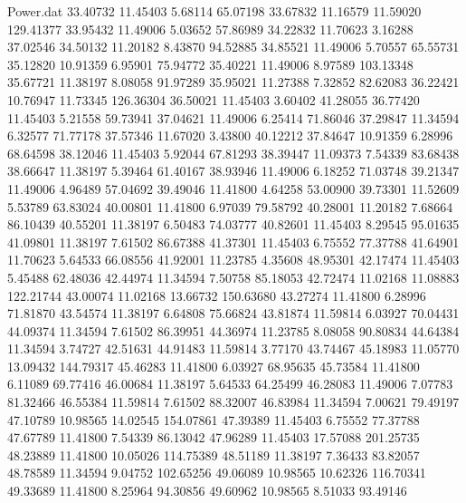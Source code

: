 \begin{filecontents}{Power.dat}
  33.40732   11.45403    5.68114   65.07198
  33.67832   11.16579   11.59020  129.41377
  33.95432   11.49006    5.03652   57.86989
  34.22832   11.70623    3.16288   37.02546
  34.50132   11.20182    8.43870   94.52885
  34.85521   11.49006    5.70557   65.55731
  35.12820   10.91359    6.95901   75.94772
  35.40221   11.49006    8.97589  103.13348
  35.67721   11.38197    8.08058   91.97289
  35.95021   11.27388    7.32852   82.62083
  36.22421   10.76947   11.73345  126.36304
  36.50021   11.45403    3.60402   41.28055
  36.77420   11.45403    5.21558   59.73941
  37.04621   11.49006    6.25414   71.86046
  37.29847   11.34594    6.32577   71.77178
  37.57346   11.67020    3.43800   40.12212
  37.84647   10.91359    6.28996   68.64598
  38.12046   11.45403    5.92044   67.81293
  38.39447   11.09373    7.54339   83.68438
  38.66647   11.38197    5.39464   61.40167
  38.93946   11.49006    6.18252   71.03748
  39.21347   11.49006    4.96489   57.04692
  39.49046   11.41800    4.64258   53.00900
  39.73301   11.52609    5.53789   63.83024
  40.00801   11.41800    6.97039   79.58792
  40.28001   11.20182    7.68664   86.10439
  40.55201   11.38197    6.50483   74.03777
  40.82601   11.45403    8.29545   95.01635
  41.09801   11.38197    7.61502   86.67388
  41.37301   11.45403    6.75552   77.37788
  41.64901   11.70623    5.64533   66.08556
  41.92001   11.23785    4.35608   48.95301
  42.17474   11.45403    5.45488   62.48036
  42.44974   11.34594    7.50758   85.18053
  42.72474   11.02168   11.08883  122.21744
  43.00074   11.02168   13.66732  150.63680
  43.27274   11.41800    6.28996   71.81870
  43.54574   11.38197    6.64808   75.66824
  43.81874   11.59814    6.03927   70.04431
  44.09374   11.34594    7.61502   86.39951
  44.36974   11.23785    8.08058   90.80834
  44.64384   11.34594    3.74727   42.51631
  44.91483   11.59814    3.77170   43.74467
  45.18983   11.05770   13.09432  144.79317
  45.46283   11.41800    6.03927   68.95635
  45.73584   11.41800    6.11089   69.77416
  46.00684   11.38197    5.64533   64.25499
  46.28083   11.49006    7.07783   81.32466
  46.55384   11.59814    7.61502   88.32007
  46.83984   11.34594    7.00621   79.49197
  47.10789   10.98565   14.02545  154.07861
  47.39389   11.45403    6.75552   77.37788
  47.67789   11.41800    7.54339   86.13042
  47.96289   11.45403   17.57088  201.25735
  48.23889   11.41800   10.05026  114.75389
  48.51189   11.38197    7.36433   83.82057
  48.78589   11.34594    9.04752  102.65256
  49.06089   10.98565   10.62326  116.70341
  49.33689   11.41800    8.25964   94.30856
  49.60962   10.98565    8.51033   93.49146

\end{filecontents}
